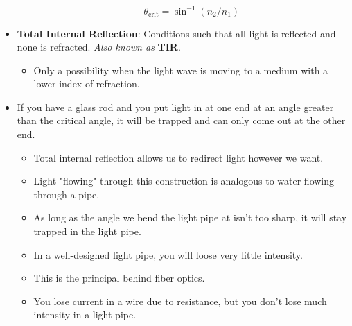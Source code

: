 \documentclass[../notes.tex]{subfiles}
\begin{document}
\begin{itemize}
\begin{itemize}
        \begin{equation*}
            \theta_\text{crit} = \sin^{-1}(n_2/n_1)
        \end{equation*}
    \end{itemize}
    \item \textbf{Total Internal Reflection}: Conditions such that all light is reflected and none is refracted. \emph{Also known as} \textbf{TIR}.
    \begin{itemize}
        \item Only a possibility when the light wave is moving to a medium with a lower index of refraction.
    \end{itemize}
    \item If you have a glass rod and you put light in at one end at an angle greater than the critical angle, it will be trapped and can only come out at the other end.
    \begin{itemize}
        \item Total internal reflection allows us to redirect light however we want.
        \item Light "flowing" through this construction is analogous to water flowing through a pipe.
        \item As long as the angle we bend the light pipe at isn't too sharp, it will stay trapped in the light pipe.
        \item In a well-designed light pipe, you will loose very little intensity.
        \item This is the principal behind fiber optics.
        \item You lose current in a wire due to resistance, but you don't lose much intensity in a light pipe.
    \end{itemize}
\end{itemize}
\end{document}
